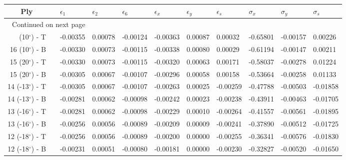 \begin{table}[H]
\caption{Stresses are in [GPa].}
\begin{longtable}{@{}rllllllllll@{}}
\toprule
                 \multicolumn{1}{c}{Ply} &\phantom{a}&  $\epsilon_1$ &  $\epsilon_2$ &  $\epsilon_6$ &  $\epsilon_x$ &  $\epsilon_y$ &  $\epsilon_s$ &  $\sigma_x$ &  $\sigma_y$ &  $\sigma_s$ \\
\midrule
\endhead
\midrule
\multicolumn{3}{r}{{Continued on next page}} \\
\midrule
\endfoot

\bottomrule
\endlastfoot
  16 (10$^\circ$) - T &&      -0.00355 &       0.00078 &      -0.00124 &      -0.00363 &       0.00087 &       0.00032 &    -0.65801 &    -0.00157 &     0.00226 \\
  16 (10$^\circ$) - B &&      -0.00330 &       0.00073 &      -0.00115 &      -0.00338 &       0.00080 &       0.00029 &    -0.61194 &    -0.00147 &     0.00211 \\\midrule
  15 (20$^\circ$) - T &&      -0.00330 &       0.00073 &      -0.00115 &      -0.00320 &       0.00063 &       0.00171 &    -0.58037 &    -0.00278 &     0.01224 \\
  15 (20$^\circ$) - B &&      -0.00305 &       0.00067 &      -0.00107 &      -0.00296 &       0.00058 &       0.00158 &    -0.53664 &    -0.00258 &     0.01133 \\\midrule
 14 (-13$^\circ$) - T &&      -0.00305 &       0.00067 &      -0.00107 &      -0.00263 &       0.00025 &      -0.00259 &    -0.47788 &    -0.00503 &    -0.01858 \\
 14 (-13$^\circ$) - B &&      -0.00281 &       0.00062 &      -0.00098 &      -0.00242 &       0.00023 &      -0.00238 &    -0.43911 &    -0.00463 &    -0.01705 \\\midrule
 13 (-16$^\circ$) - T &&      -0.00281 &       0.00062 &      -0.00098 &      -0.00229 &       0.00010 &      -0.00264 &    -0.41557 &    -0.00561 &    -0.01895 \\
 13 (-16$^\circ$) - B &&      -0.00256 &       0.00056 &      -0.00089 &      -0.00209 &       0.00009 &      -0.00241 &    -0.37890 &    -0.00512 &    -0.01725 \\\midrule
 12 (-18$^\circ$) - T &&      -0.00256 &       0.00056 &      -0.00089 &      -0.00200 &       0.00000 &      -0.00255 &    -0.36341 &    -0.00576 &    -0.01830 \\
 12 (-18$^\circ$) - B &&      -0.00231 &       0.00051 &      -0.00080 &      -0.00181 &       0.00000 &      -0.00230 &    -0.32827 &    -0.00520 &    -0.01650 \\\midrule

\end{longtable}
\end{table}
